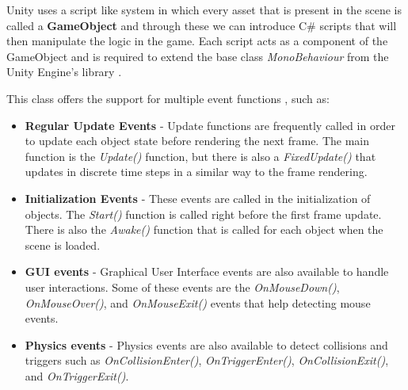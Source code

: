 Unity uses a script like system in which every asset that is present in the scene is called a \textbf{GameObject} and through these we can introduce C\# scripts that will then manipulate the logic in the game. Each script acts as a component of the GameObject and is required to extend the base class \textit{MonoBehaviour} from the Unity Engine's library \cite{unityDocMonoBehaviour}.

This class offers the support for multiple event functions \cite{unityDocEvent}, such as:

\begin{itemize}
    \item \textbf{Regular Update Events} - Update functions are frequently called in order to update each object state before rendering the next frame. The main function is the \textit{Update()} function, but there is also a \textit{FixedUpdate()} that updates in discrete time steps in a similar way to the frame rendering.

    \item \textbf{Initialization Events} - These events are called in the initialization of objects. The \textit{Start()} function is called right before the first frame update. There is also the \textit{Awake()} function that is called for each object when the scene is loaded. 
    
    \item \textbf{GUI events} - Graphical User Interface events are also available to handle user interactions. Some of these events are the \textit{OnMouseDown()}, \textit{OnMouseOver()}, and \textit{OnMouseExit()} events that help detecting mouse events.
    
    \item \textbf{Physics events} - Physics events are also available to detect collisions and triggers such as \textit{OnCollisionEnter()}, \textit{OnTriggerEnter()}, \textit{OnCollisionExit()}, and \textit{OnTriggerExit()}.
\end{itemize}


